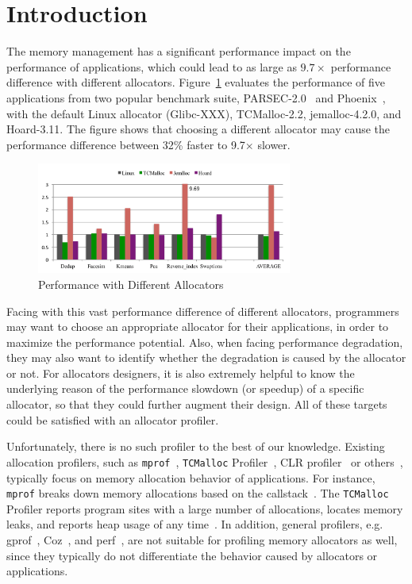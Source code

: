 

\section{Introduction}

The memory management has a significant performance impact on the performance of applications, which could lead to as large as $9.7\times$ performance difference with different allocators. Figure~\ref{fig:motivation} evaluates the performance of five applications from two popular benchmark suite, PARSEC-2.0~\cite{parsec} and Phoenix~\cite{phoenix}, with the default Linux allocator (Glibc-XXX), TCMalloc-2.2, jemalloc-4.2.0, and Hoard-3.11. The figure shows that choosing a different allocator may cause the performance difference between 32\% faster to 9.7$\times$ slower.   

\begin{figure}[!ht]
\centering
\includegraphics[width=3.3in]{figures/motivation}
\caption{Performance with Different Allocators\label{fig:motivation}}
\end{figure}

Facing with this vast performance difference of different allocators, programmers may want to choose an appropriate allocator for their applications, in order to maximize the performance potential. Also, when facing performance degradation, they may also want to identify whether the degradation is caused by the allocator or not. For allocators designers, it is also extremely helpful to know the underlying reason of the performance slowdown (or speedup) of a specific allocator, so that they could further augment their design. All of these targets could be satisfied with an allocator profiler.  

Unfortunately, there is no such profiler to the best of our knowledge. Existing allocation profilers, such as \texttt{mprof}~\cite{Zorn:1988:MAP:894814}, \texttt{TCMalloc} Profiler~\cite{tcmalloc-profiler}, CLR profiler~\cite{lupasc2014dynamic} or others~\cite{hirotaka2003developing}, typically focus on memory allocation behavior of applications. For instance, \texttt{mprof} breaks down  memory allocations based on the callstack~\cite{Zorn:1988:MAP:894814}. The \texttt{TCMalloc} Profiler reports program sites with a large number of allocations, locates memory leaks, and reports heap usage of any time~\cite{tcmalloc-profiler}. In addition, general profilers, e.g. gprof~\cite{DBLP:conf/sigplan/GrahamKM82}, Coz~\cite{Coz}, and perf~\cite{perf}, are not suitable for profiling memory allocators as well, since they typically do not differentiate the behavior caused by allocators or applications.  
 

